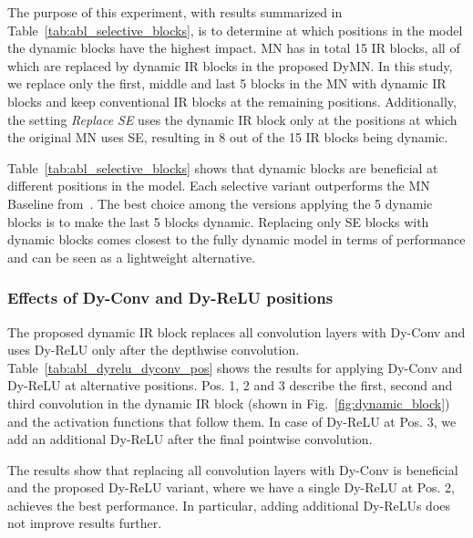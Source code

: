 \documentclass[lettersize,journal]{IEEEtran}
\begin{document}
The purpose of this experiment, with results summarized in Table~\ref{tab:abl_selective_blocks}, is to determine at which positions in the model the dynamic blocks have the highest impact. MN has in total 15 IR blocks, all of which are replaced by dynamic IR blocks in the proposed DyMN. In this study, we replace only the first, middle and last 5 blocks in the MN with dynamic IR blocks and keep conventional IR blocks at the remaining positions. Additionally, the setting \textit{Replace SE} uses the dynamic IR block only at the positions at which the original MN uses SE, resulting in 8 out of the 15 IR blocks being dynamic.

Table~\ref{tab:abl_selective_blocks} shows that dynamic blocks are beneficial at different positions in the model. Each selective variant outperforms the MN Baseline from~\cite{Schmid22Efficient}. The best choice among the versions applying the 5 dynamic blocks is to make the last 5 blocks dynamic. Replacing only SE blocks with dynamic blocks comes closest to the fully dynamic model in terms of performance and can be seen as a lightweight alternative.


\subsubsection{Effects of Dy-Conv and Dy-ReLU positions}

The proposed dynamic IR block replaces all convolution layers with Dy-Conv and uses Dy-ReLU only after the depthwise convolution.  Table~\ref{tab:abl_dyrelu_dyconv_pos} shows the results for applying Dy-Conv and Dy-ReLU at alternative positions. Pos. 1, 2 and 3 describe the first, second and third convolution in the dynamic IR block (shown in Fig.~\ref{fig:dynamic_block}) and the activation functions that follow them. In case of Dy-ReLU at Pos. 3, we add an additional Dy-ReLU after the final pointwise convolution. 

The results show that replacing all convolution layers with Dy-Conv is beneficial and the proposed Dy-ReLU variant, where we have a single Dy-ReLU at Pos. 2, achieves the best performance. In particular, adding additional Dy-ReLUs does not improve results further.
\end{document}
